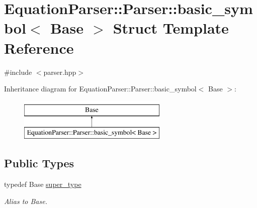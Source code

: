 \hypertarget{structEquationParser_1_1Parser_1_1basic__symbol}{}\section{Equation\+Parser\+:\+:Parser\+:\+:basic\+\_\+symbol$<$ Base $>$ Struct Template Reference}
\label{structEquationParser_1_1Parser_1_1basic__symbol}


{\ttfamily \#include $<$parser.\+hpp$>$}

Inheritance diagram for Equation\+Parser\+:\+:Parser\+:\+:basic\+\_\+symbol$<$ Base $>$\+:\begin{figure}[H]
\begin{center}
\leavevmode
\includegraphics[height=2.000000cm]{structEquationParser_1_1Parser_1_1basic__symbol}
\end{center}
\end{figure}
\subsection*{Public Types}
\begin{DoxyCompactItemize}
\item 
typedef Base \hyperlink{structEquationParser_1_1Parser_1_1basic__symbol_a7ffb114bfe6a321069bbd6baeaefa0f7}{super\+\_\+type}\hypertarget{structEquationParser_1_1Parser_1_1basic__symbol_a7ffb114bfe6a321069bbd6baeaefa0f7}{}\label{structEquationParser_1_1Parser_1_1basic__symbol_a7ffb114bfe6a321069bbd6baeaefa0f7}

\begin{DoxyCompactList}\small\item\em Alias to Base. \end{DoxyCompactList}\end{DoxyCompactItemize}

